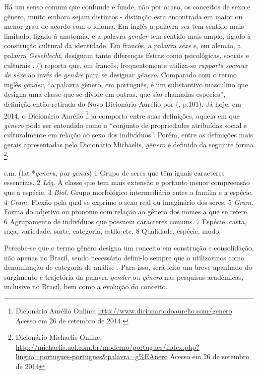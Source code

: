 Há um senso comum que confunde e funde, não por acaso, os conceitos de sexo e gênero, muito embora sejam distintos - distinção esta encontrada em maior ou menor grau de acordo com o idioma. Em inglês a palavra \emph{sex} tem sentido mais limitado, ligado à anatomia, e a palavra \emph{gender} tem sentido mais amplo, ligado à construção cultural da identidade. Em francês, a palavra \emph{séxe} e, em alemão, a palavra \emph{Geschlecht}, designam tanto diferenças físicas como psicológicas, sociais e culturais \cite{FRAISSE2001}.  (\citeyear{MORAES1998}) reporta que, em francês, frequentemente utiliza-se \emph{rapports sociaux de séxe} ao invés de \emph{gendre} para se designar \emph{gênero}. Comparado com o termo inglês \emph{gender}, ``a palavra gênero, em português, é um substantivo masculino que designa uma classe que se divide em outras, que são chamadas espécies'', definição então retirada do Novo Dicionário Aurélio por  (\citeyear{MORAES1998}, p.101).
Já hoje, em 2014, o Dicionário Aurélio
\footnote{Dicionário Aurélio Online: \url{http://www.dicionariodoaurelio.com/genero} Acesso em 26 de setembro de 2014.}
já comporta entre suas definições, aquela em que \emph{gênero} pode ser entendido como o ``conjunto de propriedades atribuídas social e culturalmente em relação ao sexo dos indivíduos''.
Porém, entre as definições mais gerais apresentadas pelo Dicionário Michaelis, \emph{gênero} é definido da seguinte forma
\footnote{Dicionário Michaelis Online: \url{http://michaelis.uol.com.br/moderno/portugues/index.php?lingua=portugues-portugues&palavra=g\%EAnero} Acesso em 26 de setembro de 2014}:

\begin{citacao}
s.m. (lat *\emph{generu}, por \emph{genus}) 1 Grupo de seres que têm iguais caracteres essenciais. 2 \emph{Lóg.} A classe que tem mais extensão e portanto menor compreensão que a espécie. 3 \emph{Biol.} Grupo morfológico intermediário entre a família e a espécie. 4 \emph{Gram.} Flexão pela qual se exprime o sexo real ou imaginário dos seres. 5 \emph{Gram.} Forma do adjetivo ou pronome com relação ao gênero dos nomes a que se refere. 6 Agrupamento de indivíduos que possuem caracteres comuns. 7 Espécie, casta, raça, variedade, sorte, categoria, estilo etc. 8 Qualidade, espécie, modo.
\end{citacao}

Percebe-se que o termo gênero designa um conceito em construção e consolidação, não apenas no Brasil, sendo necessário defini-lo sempre que o utilizarmos como denominação de categoria de análise \cite{MORAES1998}. Para isso, será feito um breve apanhado do surgimento e trajetória da palavra \emph{gender} ou \emph{gênero} nas pesquisas acadêmicas, inclusive no Brasil, bem como a evolução do conceito.


